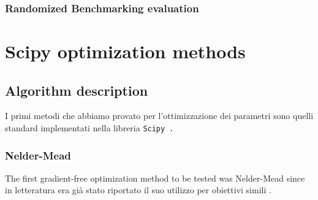 \subsubsection{Randomized Benchmarking evaluation}



\section{Scipy optimization methods}\label{Sec:OptimizationMethods}

\subsection{Algorithm description}
I primi metodi che abbiamo provato per l'ottimizzazione dei parametri sono quelli standard implementati nella libreria \tt{Scipy} \cite{SciPy-NMeth}.

\subsubsection{Nelder-Mead}
The first gradient-free optimization method to be tested was Nelder-Mead since in letteratura era già stato riportato il suo utilizzo per obiettivi simili \cite{kelly_optimal_2014}.

